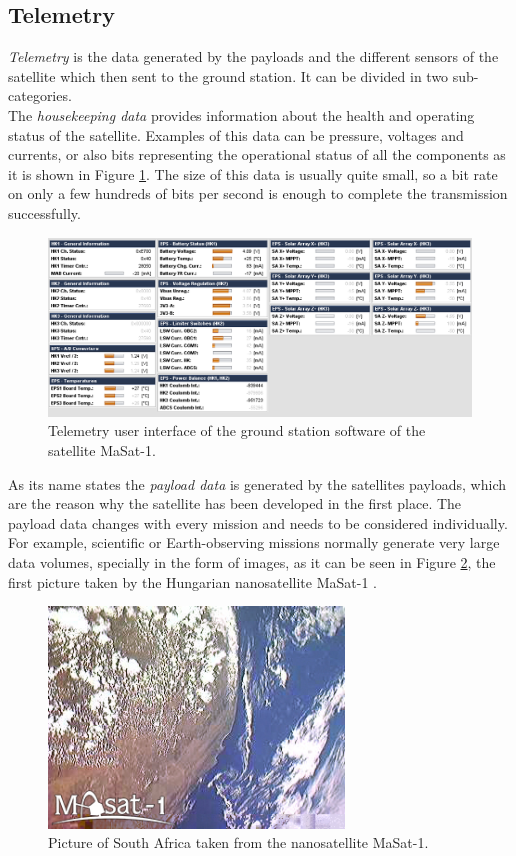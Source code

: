 \subsection{Telemetry}

\emph{Telemetry} is the data generated by the payloads and the different sensors of the satellite which then sent to the ground station. It can be divided in two sub-categories.\\

The \emph{housekeeping data} provides information about the health and operating status of the satellite. Examples of this data can be pressure, voltages and currents, or also bits representing the operational status of all the components as it is shown in Figure \ref{f2.5}. The size of this data is usually quite small, so a bit rate on only a few hundreds of bits per second is enough to complete the transmission successfully.

\begin{figure}[H]
\centerline{\includegraphics[width=1\textwidth]{images/housekeeping.png}}
\caption{Telemetry user interface of the ground station software of the satellite MaSat-1.}
\label{f2.5}
\end{figure}

As its name states the \emph{payload data} is generated by the satellites payloads, which are the reason why the satellite has been developed in the first place. The payload data changes with every mission and needs to be considered individually. For example, scientific or Earth-observing missions normally generate very large data volumes, specially in the form of images, as it can be seen in Figure \ref{f2.6}, the first picture taken by the Hungarian nanosatellite MaSat-1 \cite{Masat}.

\begin{figure}[H]
\centerline{\includegraphics[width=0.7\textwidth]{images/masat.jpg}}
\caption{Picture of South Africa taken from the nanosatellite MaSat-1.}
\label{f2.6}
\end{figure}

